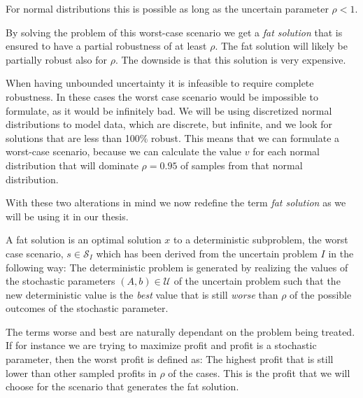 For normal distributions this is possible as long as the uncertain
parameter $\rho < 1$.


By solving the problem of this worst-case scenario we get a \emph{fat solution}
that is ensured to have a partial robustness of at least $\rho$. The
fat solution will likely be partially robust also for $\rho$. The
downside is that this solution is very expensive.

When having unbounded uncertainty it is infeasible to require complete
robustness. In these cases
the worst case scenario would be impossible to formulate, as it would
be infinitely bad. We will be using discretized normal
distributions to model data, which are discrete, but infinite, and we
look for solutions that are less than 100$\%$ robust. This means that
we can formulate a worst-case scenario, because we can calculate the
value $v$ for each normal distribution that will dominate $\rho = 0.95$ of
samples from that normal distribution.

With these two alterations in mind we now redefine the term \emph{fat
solution} as we will be using it in our thesis.

\begin{definition} A fat solution is an optimal solution $x$
to a deterministic subproblem, the worst case scenario, $s \in
\mathcal{S}_I$ which has been derived from the uncertain problem $I$
in the following way: The deterministic problem is generated by
realizing the values of the stochastic parameters $(A,b) \in
\mathcal{U}$ of the uncertain problem such that the new deterministic
value is the \emph{best} value that is still \emph{worse} than $\rho$
of the possible outcomes of the stochastic parameter. 
\end{definition}
The terms worse and best are naturally dependant on the problem being
treated. If for instance we are trying to maximize profit and profit
is a stochastic parameter, then the worst profit is defined as: The
highest profit that is still lower than other sampled profits in
$\rho$ of the cases. This is the profit that we will choose for the
scenario that generates the fat solution. 

